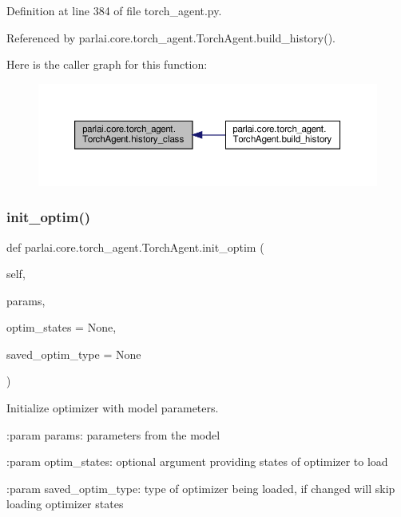 Definition at line 384 of file torch\+\_\+agent.\+py.



Referenced by parlai.\+core.\+torch\+\_\+agent.\+Torch\+Agent.\+build\+\_\+history().

Here is the caller graph for this function\+:
\nopagebreak
\begin{figure}[H]
\begin{center}
\leavevmode
\includegraphics[width=350pt]{classparlai_1_1core_1_1torch__agent_1_1TorchAgent_a0bd9118252c602bb9d5a596ecae16717_icgraph}
\end{center}
\end{figure}
\mbox{\label{classparlai_1_1core_1_1torch__agent_1_1TorchAgent_a3784f1ddaa6ffad009716910f3f36dd4}} 
\subsubsection{\texorpdfstring{init\+\_\+optim()}{init\_optim()}}
{\footnotesize\ttfamily def parlai.\+core.\+torch\+\_\+agent.\+Torch\+Agent.\+init\+\_\+optim (\begin{DoxyParamCaption}\item[{}]{self,  }\item[{}]{params,  }\item[{}]{optim\+\_\+states = {\ttfamily None},  }\item[{}]{saved\+\_\+optim\+\_\+type = {\ttfamily None} }\end{DoxyParamCaption})}

\begin{DoxyVerb}Initialize optimizer with model parameters.

:param params:
    parameters from the model

:param optim_states:
    optional argument providing states of optimizer to load

:param saved_optim_type:
    type of optimizer being loaded, if changed will skip loading
    optimizer states
\end{DoxyVerb}
 

